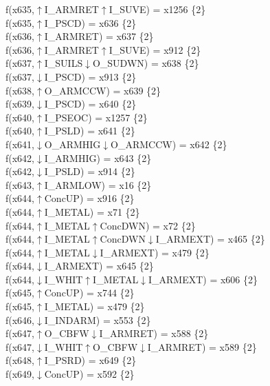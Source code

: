 f(x635,$\uparrow$I\_ARMRET$\uparrow$I\_SUVE) = x1256 \{2\} \\  
f(x635,$\uparrow$I\_PSCD) = x636 \{2\} \\  
f(x636,$\uparrow$I\_ARMRET) = x637 \{2\} \\  
f(x636,$\uparrow$I\_ARMRET$\uparrow$I\_SUVE) = x912 \{2\} \\  
f(x637,$\uparrow$I\_SUILS$\downarrow$O\_SUDWN) = x638 \{2\} \\  
f(x637,$\downarrow$I\_PSCD) = x913 \{2\} \\  
f(x638,$\uparrow$O\_ARMCCW) = x639 \{2\} \\  
f(x639,$\downarrow$I\_PSCD) = x640 \{2\} \\  
f(x640,$\uparrow$I\_PSEOC) = x1257 \{2\} \\  
f(x640,$\uparrow$I\_PSLD) = x641 \{2\} \\  
f(x641,$\downarrow$O\_ARMHIG$\downarrow$O\_ARMCCW) = x642 \{2\} \\  
f(x642,$\downarrow$I\_ARMHIG) = x643 \{2\} \\  
f(x642,$\downarrow$I\_PSLD) = x914 \{2\} \\  
f(x643,$\uparrow$I\_ARMLOW) = x16 \{2\} \\  
f(x644,$\uparrow$ConcUP) = x916 \{2\} \\  
f(x644,$\uparrow$I\_METAL) = x71 \{2\} \\  
f(x644,$\uparrow$I\_METAL$\uparrow$ConcDWN) = x72 \{2\} \\  
f(x644,$\uparrow$I\_METAL$\uparrow$ConcDWN$\downarrow$I\_ARMEXT) = x465 \{2\} \\  
f(x644,$\uparrow$I\_METAL$\downarrow$I\_ARMEXT) = x479 \{2\} \\  
f(x644,$\downarrow$I\_ARMEXT) = x645 \{2\} \\  
f(x644,$\downarrow$I\_WHIT$\uparrow$I\_METAL$\downarrow$I\_ARMEXT) = x606 \{2\} \\  
f(x645,$\uparrow$ConcUP) = x744 \{2\} \\  
f(x645,$\uparrow$I\_METAL) = x479 \{2\} \\  
f(x646,$\downarrow$I\_INDARM) = x553 \{2\} \\  
f(x647,$\uparrow$O\_CBFW$\downarrow$I\_ARMRET) = x588 \{2\} \\  
f(x647,$\downarrow$I\_WHIT$\uparrow$O\_CBFW$\downarrow$I\_ARMRET) = x589 \{2\} \\  
f(x648,$\uparrow$I\_PSRD) = x649 \{2\} \\  
f(x649,$\downarrow$ConcUP) = x592 \{2\} \\  

